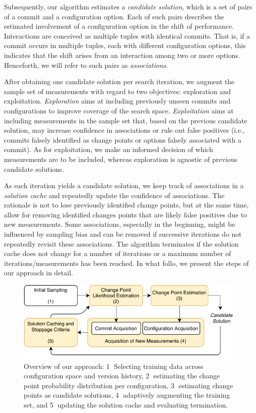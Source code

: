 \documentclass[sigconf]{acmart}
\begin{document}
	Subsequently, our algorithm estimates a \emph{candidate solution}, which is a set of pairs of a commit and a configuration option. 
	Each of such pairs describes the estimated involvement of a configuration option in the shift of performance. 
	Interactions are conceived as multiple tuples with identical commits. That is, if a commit occurs in multiple tuples, each with different configuration options, this indicates that the shift arises from an interaction among two or more options. 
	Henceforth, we will refer to such pairs as \emph{associations}.
	
	After obtaining one candidate solution per search iteration, we augment the sample set of measurements with regard to two objectives: exploration and exploitation. 
	\emph{Exploration} aims at including previously unseen commits and configurations to improve coverage of the search space. 
	\emph{Exploitation} aims at including measurements in the sample set that, based on the previous candidate solution, may increase confidence in associations or rule out false positives (i.e., commits falsely identified as change points or options falsely associated with a commit). 
	As for exploitation, we make an informed decision of which measurements are to be included, whereas exploration is agnostic of previous candidate solutions.
	
	As each iteration yields a candidate solution, we keep track of associations in a \emph{solution cache} and repeatedly update the confidence of associations. 
	The rationale is not to lose previously identified change points, but at the same time, allow for removing identified changes points that are likely false positives due to new measurements.
	Some associations, especially in the beginning, might be influenced by sampling bias and can be removed if successive iterations do not repeatedly revisit these associations. 
	The algorithm terminates if the solution cache does not change for a number of iterations or a maximum number of iterations/measurements has been reached.
	In what follo, we present the steps of our approach in detail. 
	
	\begin{figure}[ht]
		\includegraphics[width=\linewidth]{images/diagram_april.pdf}
		\caption{Overview of our approach:  \textcircled{1} Selecting training data across configuration space and version history, \textcircled{2} estimating the change point probability distribution per configuration, \textcircled{3} estimating change points as candidate solutions, \textcircled{4} adaptively augmenting the training set, and \textcircled{5} updating the solution cache and evaluating termination.}
		\label{fig:overview}
	\end{figure}
	
\end{document}
